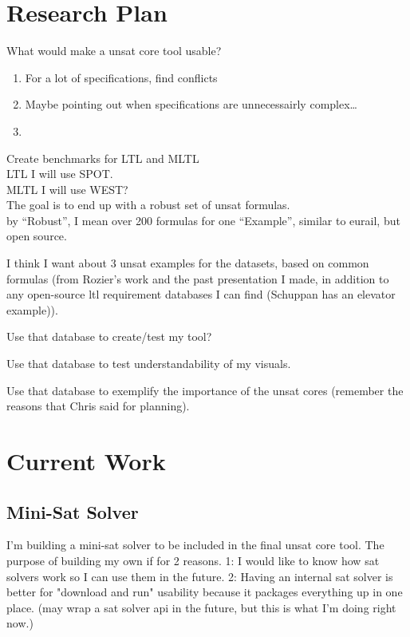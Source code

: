 \documentclass{article}
\begin{document}
\section*{Research Plan}
What would make a unsat core tool usable?
\begin{enumerate}
    \item For a lot of specifications, find conflicts
    \item Maybe pointing out when specifications are unnecessairly complex\dots
    \item 
\end{enumerate}


Create benchmarks for LTL and MLTL\\
LTL I will use SPOT.\\
MLTL I will use WEST?\\

The goal is to end up with a robust set of unsat formulas.\\
by ``Robust'', I mean over 200 formulas for one ``Example'', similar to eurail, but open source.

I think I want about 3 unsat examples for the datasets, based on common formulas (from Rozier's work and the past presentation I made, in addition to any open-source ltl requirement databases I can find (Schuppan has an elevator example)).

Use that database to create/test my tool?

Use that database to test understandability of my visuals.

Use that database to exemplify the importance of the unsat cores (remember the reasons that Chris said for planning).

\section*{Current Work}
\subsection*{Mini-Sat Solver}
I'm building a mini-sat solver to be included in the final unsat core tool. The purpose of building my own if for 2 reasons. 1: I would like to know how sat solvers work so I can use them in the future. 2: Having an internal sat solver is better for "download and run" usability because it packages everything up in one place. (may wrap a sat solver api in the future, but this is what I'm doing right now.)
\end{document}

